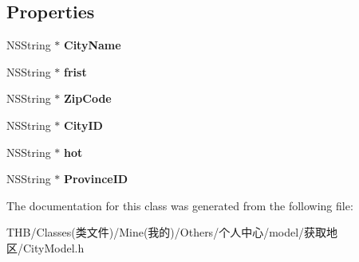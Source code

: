 \subsection*{Properties}
\begin{DoxyCompactItemize}
\item 
\mbox{\label{interface_city_model_a614d21083cbc35bf91c0f781ba850294}} 
N\+S\+String $\ast$ {\bfseries City\+Name}
\item 
\mbox{\label{interface_city_model_a771f971a2111eb927ece8dd83c1fe375}} 
N\+S\+String $\ast$ {\bfseries frist}
\item 
\mbox{\label{interface_city_model_a16a2cf171da2e676ab7d7b0e0627c21b}} 
N\+S\+String $\ast$ {\bfseries Zip\+Code}
\item 
\mbox{\label{interface_city_model_af13d91660fe10eb0b3c9afbdbb119ab7}} 
N\+S\+String $\ast$ {\bfseries City\+ID}
\item 
\mbox{\label{interface_city_model_a75d64b0f2504b46ee6af4dd211203546}} 
N\+S\+String $\ast$ {\bfseries hot}
\item 
\mbox{\label{interface_city_model_a6994c3e8c52159dbbadd2a1a9bc43b99}} 
N\+S\+String $\ast$ {\bfseries Province\+ID}
\end{DoxyCompactItemize}


The documentation for this class was generated from the following file\+:\begin{DoxyCompactItemize}
\item 
T\+H\+B/\+Classes(类文件)/\+Mine(我的)/\+Others/个人中心/model/获取地区/City\+Model.\+h\end{DoxyCompactItemize}
